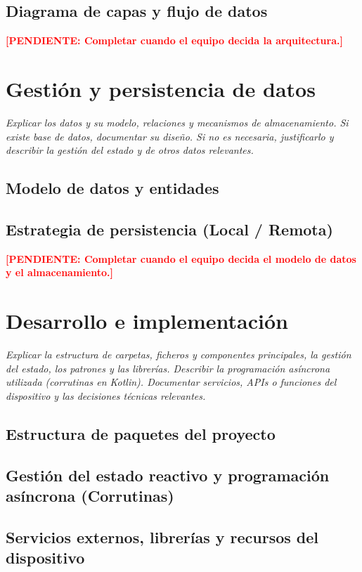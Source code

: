 \documentclass[11pt,a4paper]{article}
\newcommand{\pendiente}[1]{\textcolor{red}{\textbf{[PENDIENTE: #1]}}}
\begin{document}
\subsection{Diagrama de capas y flujo de datos}

\pendiente{Completar cuando el equipo decida la arquitectura.}

\section{Gestión y persistencia de datos}
\textit{Explicar los datos y su modelo, relaciones y mecanismos de almacenamiento. Si existe base de datos, documentar su diseño. Si no es necesaria, justificarlo y describir la gestión del estado y de otros datos relevantes.}

\subsection{Modelo de datos y entidades}
\subsection{Estrategia de persistencia (Local / Remota)}

\pendiente{Completar cuando el equipo decida el modelo de datos y el almacenamiento.}

\section{Desarrollo e implementación}
\textit{Explicar la estructura de carpetas, ficheros y componentes principales, la gestión del estado, los patrones y las librerías. Describir la programación asíncrona utilizada (corrutinas en Kotlin). Documentar servicios, APIs o funciones del dispositivo y las decisiones técnicas relevantes.}

\subsection{Estructura de paquetes del proyecto}
\subsection{Gestión del estado reactivo y programación asíncrona (Corrutinas)}
\subsection{Servicios externos, librerías y recursos del dispositivo}
\end{document}
